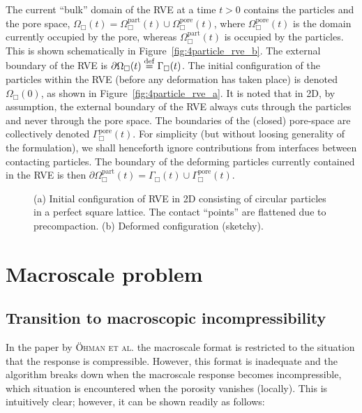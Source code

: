 \documentclass[10pt,a4paper]{article}
\newcommand{\figref}[1]{Figure~\ref{#1}}
\newcommand{\pore}{\mathrm{pore}}
\newcommand{\particle}{\mathrm{part}}
\begin{document}
The current ``bulk'' domain of the RVE at a time $t>0$ contains the particles and the pore space, $\Omega_\Box(t)=\Omega^\particle_\Box(t)\cup\Omega_\Box^\pore(t)$, where $\Omega_\Box^\pore(t)$ is the domain currently occupied by the pore, whereas $\Omega_\Box^\particle(t)$ is occupied by the particles. This is shown schematically in \figref{fig:4particle_rve_b}.
The external boundary of the RVE is $\partial\Omega_\Box(t)\overset{\mathrm{def}}{=}\Gamma_\Box(t)$. The initial configuration of the particles within the RVE (before any deformation has taken place) is denoted $\Omega_\Box(0)$, as shown in \figref{fig:4particle_rve_a}. It is noted that in 2D, by assumption, the external boundary of the RVE always cuts through the particles and never through the pore space. The boundaries of the (closed) pore-space are collectively denoted $\Gamma_\Box^\pore(t)$. For simplicity (but without loosing generality of the formulation), we shall henceforth ignore contributions from interfaces between contacting particles. The boundary of the deforming particles currently contained in the RVE is then $\partial\Omega^\particle_\Box(t)=\Gamma_\Box(t)\cup\Gamma_\Box^\pore(t)$.
\begin{figure}[th!]
    \centering
    \subfloat[$t = 0$]{\label{fig:4particle_rve_a}}
    \subfloat[$t > 0$]{\label{fig:4particle_rve_b}}
    \caption{(a) Initial configuration of RVE in 2D consisting of circular particles in a perfect square lattice. The contact ``points'' are flattened due to precompaction. (b) Deformed configuration (sketchy).}
    \label{fig:4particleRVE}
\end{figure}

\section{Macroscale problem}\label{sec:macro}

\subsection{Transition to macroscopic incompressibility}

In the paper by \textsc{Öhman et al.} \cite{OhmanRunLar2011} the macroscale format is restricted to the situation that the response is compressible. However, this format is inadequate and the algorithm breaks down when the macroscale response becomes incompressible, which situation is encountered when the porosity vanishes (locally). This is intuitively clear; however, it can be shown readily as follows:
\end{document}
